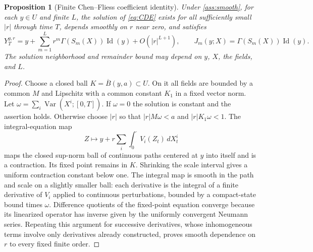 \documentclass[11pt,a4paper]{article}
\numberwithin{equation}{section}
\newtheorem{proposition}[theorem]{Proposition}
\theoremstyle{definition}
\theoremstyle{remark}
\DeclareMathOperator{\Id}{Id}
\DeclareMathOperator{\Var}{Var}
\begin{document}
\begin{proposition}[Finite Chen--Fliess coefficient identity]\label{prop:jets}
Under \cref{ass:smooth}, for each $y\in U$ and finite $L$, the solution
of \eqref{eq:CDE} exists for all sufficiently small $|r|$ through time $T$,
depends smoothly on $r$ near zero, and satisfies
\begin{equation}\label{eq:jets}
 Y_T^{y,r}=y+\sum_{m=1}^L r^m\Gamma(S_m(X))\Id(y)
 +O(|r|^{L+1}),\qquad
 J_m(y;X)=\Gamma(S_m(X))\Id(y).
\end{equation}
The solution neighborhood and remainder bound may depend on $y$, $X$, the
fields, and $L$.
\end{proposition}
\begin{proof}
Choose a closed ball $K=\overline B(y,a)\subset U$. On it all fields are
bounded by a common $M$ and Lipschitz with a common constant $K_1$ in a
fixed vector norm. Let $\omega=\sum_i\Var(X^i;[0,T])$. If $\omega=0$
the solution is constant and the assertion holds. Otherwise choose $|r|$
so that $|r|M\omega<a$ and $|r|K_1\omega<1$. The integral-equation map
\[
 Z\longmapsto y+r\sum_i\int_0^{\cdot}V_i(Z_t)\,dX_t^i
\]
maps the closed sup-norm ball of continuous paths centered at $y$ into
itself and is a contraction. Its fixed point remains in $K$. Shrinking
the scale interval gives a uniform contraction constant below one.
The integral map is smooth in the path and scale on a slightly smaller
ball: each derivative is the integral of a finite derivative of $V_i$
applied to continuous perturbations, bounded by a compact-state bound
times $\omega$. Difference quotients of the fixed-point equation converge
because its linearized operator has inverse given by the uniformly
convergent Neumann series. Repeating this argument for successive
derivatives, whose inhomogeneous terms involve only derivatives already
constructed, proves smooth dependence on $r$ to every fixed finite order.


\end{proof}
\end{document}
